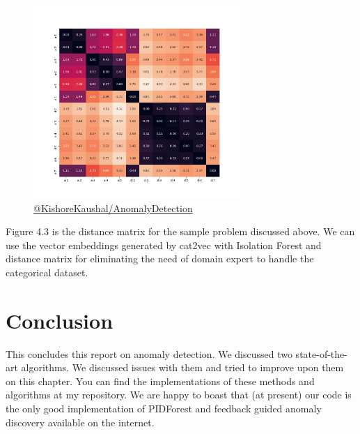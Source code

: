 \begin{figure}[!ht]
    \label{fig:distance-matrix}
    \centering
    \includegraphics[width=0.7\textwidth]{../fig/chapter4/InterFeatureDistance.png}
    {\href{https://github.com/KishoreKaushal/AnomalyDetection/blob/master/isolationforest/cat2vec.py}{@KishoreKaushal/AnomalyDetection}}
\end{figure}



Figure 4.3 is the distance matrix for the sample problem discussed above.
We can use the vector embeddings generated by cat2vec with Isolation Forest and distance matrix for eliminating the need of domain expert to handle the categorical dataset.

\section{Conclusion}
\label{sec:conclusion}

This concludes this report on anomaly detection.
We discussed two state-of-the-art algorithms.
We discussed issues with them and tried to improve upon them on this chapter.
You can find the implementations of these methods and algorithms at my repository.
We are happy to boast that (at present) our code is the only good implementation of PIDForest and feedback guided anomaly discovery available on the internet.

